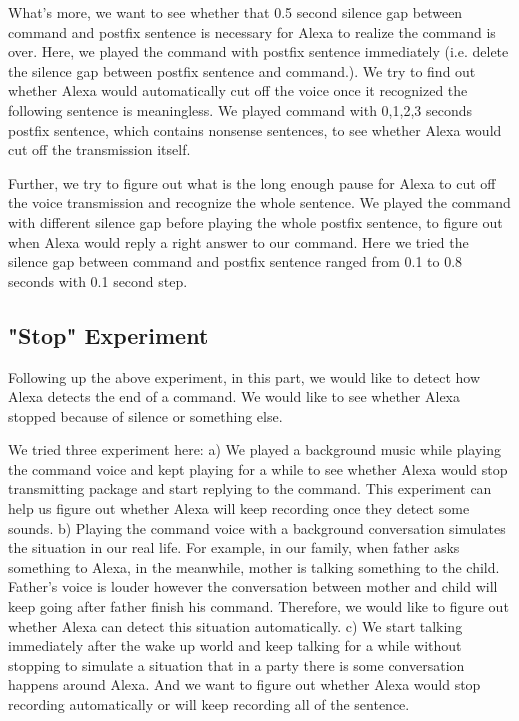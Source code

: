 What's more, we want to see whether that 0.5 second silence gap between command and postfix sentence is necessary for Alexa to realize the command is over. Here, we played the command with postfix sentence immediately (i.e. delete the silence gap between postfix sentence and command.). We try to find out whether Alexa would automatically cut off the voice once it recognized the following sentence is meaningless. We played command with 0,1,2,3 seconds postfix sentence, which contains nonsense sentences, to see whether Alexa would cut off the transmission itself.

Further, we try to figure out what is the long enough pause for Alexa to cut off the voice transmission and recognize the whole sentence. We played the command with different silence gap before playing the whole postfix sentence, to figure out when Alexa would reply a right answer to our command. Here we tried the silence gap between command and postfix sentence ranged from 0.1 to 0.8 seconds with 0.1 second step.

\subsection{"Stop" Experiment}

Following up the above experiment, in this part, we would like to detect how Alexa detects the end of a command. We would like to see whether Alexa stopped because of silence or something else.

We tried three experiment here: a) We played a background music while playing the command voice and kept playing for a while to see whether Alexa would stop transmitting package and start replying to the command. This experiment can help us figure out whether Alexa will keep recording once they detect some sounds. b) Playing the command voice with a background conversation simulates the situation in our real life. For example, in our family, when father asks something to Alexa, in the meanwhile, mother is talking something to the child. Father's voice is louder however the conversation between mother and child will keep going after father finish his command. Therefore, we would like to figure out whether Alexa can detect this situation automatically. c) We start talking immediately after the wake up world and keep talking for a while without stopping to simulate a situation that in a party there is some conversation happens around Alexa. And we want to figure out whether Alexa would stop recording automatically or will keep recording all of the sentence.



